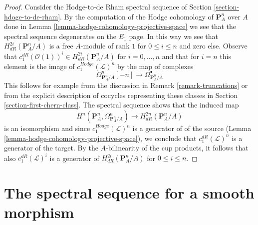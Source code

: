 \begin{proof}
Consider the Hodge-to-de Rham spectral sequence of
Section \ref{section-hdoge-to-de-rham}.
By the computation of the Hodge cohomology of $\mathbf{P}^n_A$ over $A$
done in Lemma \ref{lemma-hodge-cohomology-projective-space}
we see that the spectral sequence degenerates on the $E_1$ page.
In this way we see that $H^{2i}_{dR}(\mathbf{P}^n_A/A)$ is a free
$A$-module of rank $1$ for $0 \leq i \leq n$ and zero else.
Observe that $c_1^{dR}(\mathcal{O}(1))^i \in H^{2i}_{dR}(\mathbf{P}^n_A/A)$
for $i = 0, \ldots, n$ and that for $i = n$ this element is the
image of $c_1^{Hodge}(\mathcal{L})^n$ by the map of complexes
$$
\Omega^n_{\mathbf{P}^n_A/A}[-n]
\longrightarrow
\Omega^\bullet_{\mathbf{P}^n_A/A}
$$
This follows for example from the discussion in Remark \ref{remark-truncations}
or from the explicit description of cocycles representing these classes in
Section \ref{section-first-chern-class}.
The spectral sequence shows that the induced map
$$
H^n(\mathbf{P}^n_A, \Omega^n_{\mathbf{P}^n_A/A}) \longrightarrow
H^{2n}_{dR}(\mathbf{P}^n_A/A)
$$
is an isomorphism and since $c_1^{Hodge}(\mathcal{L})^n$ is a generator of
of the source (Lemma \ref{lemma-hodge-cohomology-projective-space}),
we conclude that $c_1^{dR}(\mathcal{L})^n$ is a generator
of the target. By the $A$-bilinearity of the cup products,
it follows that also $c_1^{dR}(\mathcal{L})^i$
is a generator of $H^{2i}_{dR}(\mathbf{P}^n_A/A)$ for
$0 \leq i \leq n$.
\end{proof}









\section{The spectral sequence for a smooth morphism}
\label{section-relative-spectral-sequence}

